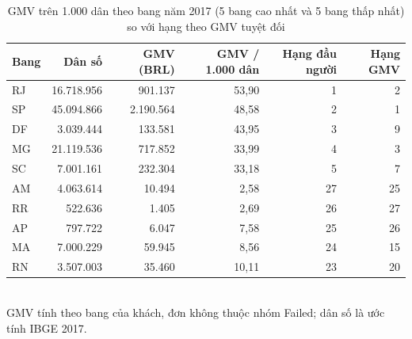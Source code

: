 \begin{table}[htbp]\centering\scriptsize\caption{GMV trên 1.000 dân theo bang năm 2017 (5 bang cao nhất và 5 bang thấp nhất) so với hạng theo GMV tuyệt đối}\label{tab:api-percapita}
\begin{tabular}{lrrrrr}\toprule
\textbf{Bang} & \textbf{Dân số} & \textbf{GMV (BRL)} & \textbf{GMV / 1.000 dân} & \textbf{Hạng đầu người} & \textbf{Hạng GMV} \\\midrule
RJ & 16.718.956 & 901.137 & 53,90 & 1 & 2 \\
SP & 45.094.866 & 2.190.564 & 48,58 & 2 & 1 \\
DF & 3.039.444 & 133.581 & 43,95 & 3 & 9 \\
MG & 21.119.536 & 717.852 & 33,99 & 4 & 3 \\
SC & 7.001.161 & 232.304 & 33,18 & 5 & 7 \\
AM & 4.063.614 & 10.494 & 2,58 & 27 & 25 \\
RR & 522.636 & 1.405 & 2,69 & 26 & 27 \\
AP & 797.722 & 6.047 & 7,58 & 25 & 26 \\
MA & 7.000.229 & 59.945 & 8,56 & 24 & 15 \\
RN & 3.507.003 & 35.460 & 10,11 & 23 & 20 \\
\bottomrule\end{tabular}\\[2pt]{\footnotesize GMV tính theo bang của khách, đơn không thuộc nhóm Failed; dân số là ước tính IBGE 2017.}
\end{table}
